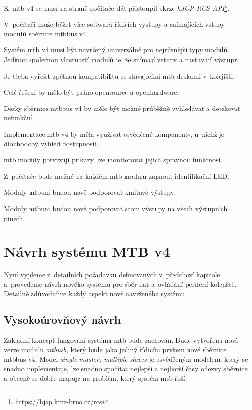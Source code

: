 \begin{compactenum}
\item K~\gls{mtb} v4 se musí na straně počítače dát přistoupit skrze
	\textit{hJOP RCS API}\footnote{\url{https://hjop.kmz-brno.cz/rcs}}.
\item V~počítači může běžet více softwarů řídících výstupy a snímajících vstupy
	modulů sběrnice \gls{mtbbus} v4.
\item Systém \gls{mtb} v4 musí být navržený univerzálně pro nejrůznější typy
	modulů. Jedinou společnou vlastností modulů je, že snímají vstupy a nastavují
	výstupy.
\item Je třeba vyřešit zpětnou kompatibilitu se stávajícími \gls{mtb} deskami
	v~kolejišti.
\item Celé řešení by mělo být psáno opensource a openhardware.
\item Desky sběrnice \gls{mtbbus} v4 by mělo být možné průběžně vyhledávat
	a detekovat nefunkční.
\item Implementace \gls{mtb} v4 by měla využívat osvědčené komponenty, u~nichž
	je dlouhodobý výhled dostupnosti.
\item \gls{mtb} moduly potvrzují příkazy, lze monitorovat jejich správnou funkčnost.
\item Z~počítače bude možné na každém \gls{mtb} modulu zapnout identifikační LED.
\item Moduly \gls{mtbuni} budou nově podporovat kmitavé výstupy.
\item Moduly \gls{mtbuni} budou nově podporovat \gls{scom} výstupy na všech
	výstupních pinech.
\end{compactenum}


\section{Návrh systému MTB v4}

Nyní vyjdeme z~detailních požadavku definovaných v~předchozí kapitole
a~provedeme návrh nového systému pro sběr dat a~ovládání periferií kolejiště.
Detailně zdůvodníme každý aspekt nově navrženého systému.

\subsection{Vysokoúrovňový návrh}

Základní koncept fungování systému \gls{mtb}  bude zachován. Bude vytvořena nová verze modulu \textit{\gls{mtbusb}},
který bude jako jediný řídicím prvkem nové sběrnice \gls{mtbbus} v4. Model
\textit{single master, multiple slaves} je osvědčeným modelem, který se snadno
implementuje, lze snadno spočítat nejlepší a nejhorší časy odezvy sběrnice a
obecně se dobře mapuje na problém, který systém \gls{mtb} řeší.

